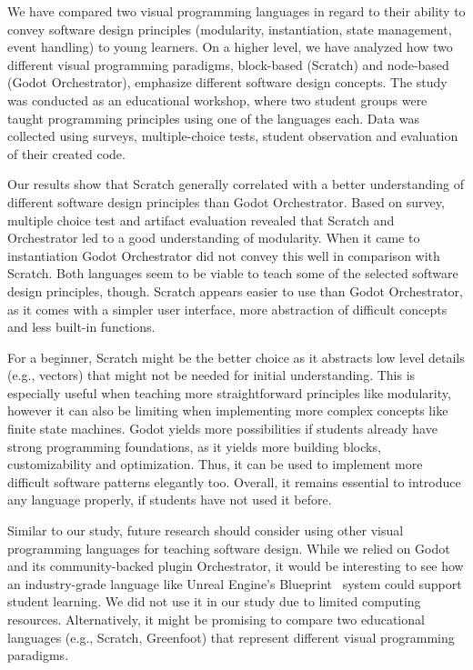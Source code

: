 We have compared two visual programming languages in regard to their ability to convey software design principles (modularity, instantiation, state management, event handling) to young learners.
On a higher level, we have analyzed how two different visual programming paradigms, block-based (Scratch) and node-based (Godot Orchestrator), emphasize different software design concepts.
The study was conducted as an educational workshop, where two student groups were taught programming principles using one of the languages each.
Data was collected using surveys, multiple-choice tests, student observation and evaluation of their created code.

Our results show that Scratch generally correlated with a better understanding of different software design principles than Godot Orchestrator.
Based on survey, multiple choice test and artifact evaluation revealed that Scratch and Orchestrator led to a good understanding of modularity.
When it came to instantiation Godot Orchestrator did not convey this well in comparison with Scratch.
Both languages seem to be viable to teach some of the selected software design principles, though.
Scratch appears easier to use than Godot Orchestrator, as it comes with a simpler user interface, more abstraction of difficult concepts and less built-in functions.

For a beginner, Scratch might be the better choice as it abstracts low level details (e.g., vectors) that might not be needed for initial understanding.
This is especially useful when teaching more straightforward principles like modularity, however it can also be limiting when implementing more complex concepts like finite state machines.
Godot yields more possibilities if students already have strong programming foundations, as it yields more building blocks, customizability and optimization.
Thus, it can be used to implement more difficult software patterns elegantly too.
Overall, it remains essential to introduce any language properly, if students have not used it before.

Similar to our study, future research should consider using other visual programming languages for teaching software design.
While we relied on Godot and its community-backed plugin Orchestrator, it would be interesting to see how an industry-grade language like Unreal Engine's Blueprint~\cite{epicgames_blueprints_2025} system could support student learning.
We did not use it in our study due to limited computing resources.
Alternatively, it might be promising to compare two educational languages (e.g., Scratch, Greenfoot) that represent different visual programming paradigms.

